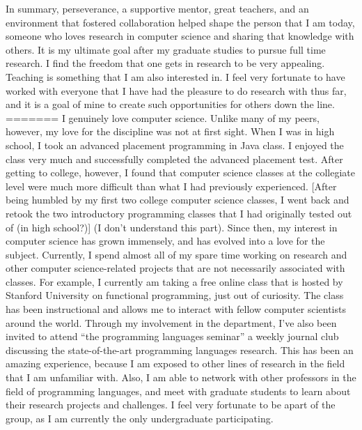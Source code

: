 \documentclass[a4paper,12pt]{article}
\begin{document}
In summary, perseverance, a supportive mentor, great teachers, and an environment that fostered collaboration helped shape the person that I am today, someone who loves research in computer science and sharing that knowledge with others.  It is my ultimate goal after my graduate studies to pursue full time research. I find the freedom that one gets in research to be very appealing.  Teaching is something that I am also interested in. I feel very fortunate to have worked with everyone that I have had the pleasure to do research with thus far, and it is a goal of mine to create such opportunities for others down the line.
=======
I genuinely love computer science. Unlike many of my peers, however, my love for the discipline was not at first sight. When I was in high school, I took an advanced placement programming in Java class. I enjoyed the class very much and successfully completed the advanced placement test. After getting to college, however, I found that computer science classes at the collegiate level were much more difficult than what I had previously experienced. [After being humbled by my first two college computer science classes, I went back and retook the two introductory programming classes that I had originally tested out of (in high school?)] (I don't understand this part). Since then, my interest in computer science has grown immensely, and has evolved into a love for the subject. Currently, I spend almost all of my spare time working on research and other computer science-related projects that are not necessarily associated with classes. For example, I currently am taking a free online class that is hosted by Stanford University on functional programming, just out of curiosity. The class has been instructional and allows me to interact with fellow computer scientists around the world. Through my involvement in the department, I've also been invited to attend ``the programming languages seminar'' a weekly journal club discussing the state-of-the-art programming languages research. This has been an amazing experience, because I am exposed to other lines of research in the field that I am unfamiliar with. Also, I am able to network with other professors in the field of programming languages, and meet with graduate students to learn about their research projects and challenges. I feel very fortunate to be apart of the group, as I am currently the only undergraduate participating.  \newline
\end{document}
